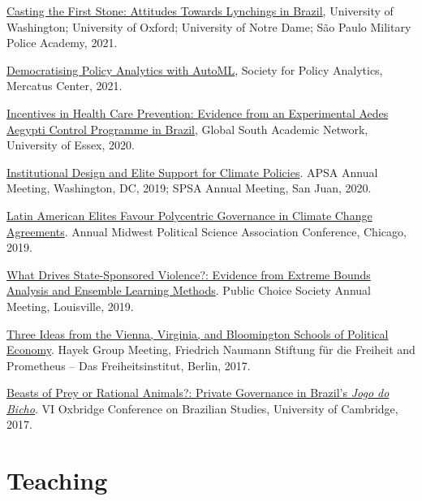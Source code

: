 \documentclass[a4paper]{article}
\renewenvironment{itemize}{
	\begin{list}{}{
			\setlength{\leftmargin}{1.5em}
		}
		}{
	\end{list}
}
\begin{document}
\begin{itemize}
\item \href{https://github.com/danilofreire/lynching-experiment-brazil}{Casting the First Stone: Attitudes Towards Lynchings in Brazil}, University of Washington; University of Oxford; University of Notre Dame; São Paulo Military Police Academy, 2021.
\item \href{http://github.com/danilofreire/mercatus-analytics-papers}{Democratising Policy Analytics with AutoML}, Society for Policy Analytics, Mercatus Center, 2021.
\item \href{https://danilofreire.github.io/essex2020/aedes.html}{Incentives in Health Care Prevention:
Evidence from an Experimental Aedes Aegypti Control Programme in Brazil}, Global South Academic Network, University of Essex, 2020.
\item \href{https://osf.io/9a6ch}{Institutional Design and Elite Support for Climate Policies}. APSA Annual Meeting, Washington, DC, 2019; SPSA Annual Meeting, San Juan, 2020.
\item \href{https://osf.io/9a6ch}{Latin American Elites Favour Polycentric Governance in Climate Change Agreements}. Annual Midwest Political Science Association Conference, Chicago, 2019.
\item \href{http://danilofreire.github.io/pcs-2019}{What Drives State-Sponsored Violence?: Evidence from Extreme Bounds Analysis and Ensemble Learning Methods}. Public Choice Society Annual Meeting, Louisville, 2019.
\item \href{https://www.overleaf.com/project/591ef5259fb58ede3dc4d369}{Three Ideas from the Vienna, Virginia, and Bloomington Schools of Political Economy}. Hayek Group Meeting, Friedrich Naumann Stiftung f{\"u}r die Freiheit and Prometheus -- Das Freiheitsinstitut, Berlin, 2017.
\item \href{https://osf.io/se2jr}{Beasts of Prey or Rational Animals?: Private Governance in Brazil's \emph{Jogo do Bicho}}. VI Oxbridge Conference on Brazilian Studies, University of Cambridge, 2017.
\end{itemize}

\section*{Teaching}
\end{document}
